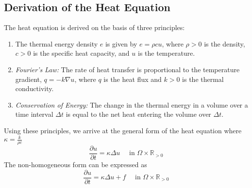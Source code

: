 \documentclass[11pt]{article}
\newcommand{\R}{\mathbb{R}}
\begin{document}
\subsection{Derivation of the Heat Equation}
The heat equation is derived on the basis of three principles:
\begin{enumerate}
\item The thermal energy density $ e$ is given by $e=\rho cu$, where $\rho >0$ is the density, $c>0$ is the specific heat capacity,  and $u$ is the temperature.
\item \textit{Fourier’s Law:} The rate of heat transfer is proportional to the temperature gradient, $q = -k \nabla u$, where $q$ is the heat flux and $k > 0$ is the thermal conductivity.
\item \textit{Conservation of Energy:} The change in the thermal energy in a volume over a time interval $\Delta t$ is equal to the net heat entering the volume over $\Delta t$.
\end{enumerate}
Using these principles, we arrive at the general form of the heat equation where $\kappa = \frac{k}{\rho c}$
$$ \frac{\partial u}{\partial t} = \kappa \Delta u \quad \text{ in } \Omega \times \R_{>0}$$
The non-homogeneous form can be expressed as 
$$ \frac{\partial u}{\partial t} = \kappa \Delta u + f \quad \text{ in } \Omega \times \R_{>0}$$
\end{document}
